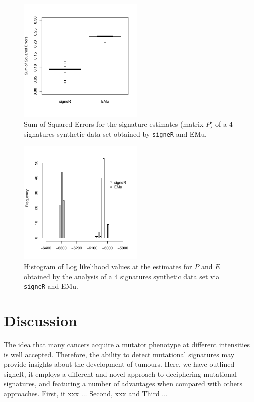 \documentclass{bioinfo}
\begin{document}
\begin{figure}  
 \centering
   \includegraphics[width=6cm]{figs/Simulation_signeR_vs_EMu_boxplot_SSE}
  \caption{\textrm{%
    Sum of Squared Errors for the signature estimates (matrix $P$) of a 4 signatures
    synthetic data set obtained by \texttt{signeR} and EMu.
   }
  }
  \label{fig:synth_SSE}
\end{figure}
\begin{figure}  
 \centering
  \includegraphics[width=6cm]{figs/Simulation_signeR_vs_EMu_histogram_LLh_same_axis}
  \caption{\textrm{%
   Histogram of Log likelihood values at the estimates for $P$ and $E$
   obtained by the analysis of a 4 signatures synthetic data set via
   \texttt{signeR} and EMu.
   }
  }
  \label{fig:synth_LLh}
\end{figure}

\section{Discussion}
The idea that many cancers acquire a mutator phenotype at different 
intensities is well accepted. Therefore, the ability to detect 
mutational signatures may provide insights about the development of
tumours. Here, we have outlined signeR, it employs a different and 
novel approach to deciphering mutational signatures, and featuring a
number of advantages when compared with others approaches. First, it
xxx $\ldots$ Second, xxx and Third $\ldots$ 
\end{document}
